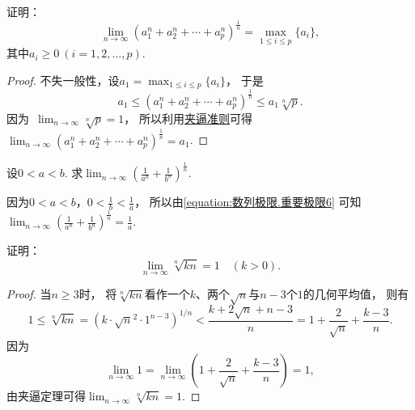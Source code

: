 \begin{example}\label{equation:数列极限.重要极限6}
证明：\begin{equation}
	\lim_{n\to\infty} (a_1^n + a_2^n + \dotsb + a_p^n)^{\frac1n}
	= \max_{1\leq i\leq p} \{a_i\},
\end{equation}
其中\(a_i\geq0\ (i=1,2,\dotsc,p)\).
\begin{proof}
不失一般性，设\(a_1 = \max_{1\leq i\leq p} \{a_i\}\)，
于是\[
	a_1 \leq (a_1^n + a_2^n + \dotsb + a_p^n)^{\frac1n} \leq a_1 \sqrt[n]{p}.
\]
因为~\hyperref[example:极限.常数的方根的极限2]{\(\lim_{n\to\infty} \sqrt[n]{p} = 1\)}，
所以利用\hyperref[theorem:数列极限.夹逼准则]{夹逼准则}可得
\(\lim_{n\to\infty} (a_1^n + a_2^n + \dotsb + a_p^n)^{\frac1n} = a_1\).
\end{proof}
\end{example}
\begin{example}
设\(0<a<b\).
求\(\lim_{n\to\infty} \left( \frac1{a^n} + \frac1{b^n} \right)^{\frac1n}\).
\begin{solution}
因为\(0<a<b\)，\(0<\frac1b<\frac1a\)，
所以由\cref{equation:数列极限.重要极限6} 可知
\(\lim_{n\to\infty} \left( \frac1{a^n} + \frac1{b^n} \right)^{\frac1n} = \frac1a\).
\end{solution}
\end{example}

\begin{example}
证明：\begin{equation}\label{equation:数列极限.重要极限3}
	\lim_{n\to\infty} \sqrt[n]{k n} = 1
	\quad(k>0).
\end{equation}
\begin{proof}
当\(n \geq 3\)时，
将\(\sqrt[n]{k n}\)看作一个\(k\)、两个\(\sqrt{n}\)与\(n-3\)个\(1\)的几何平均值，
则有\[
	1 \leq \sqrt[n]{k n} = (k \cdot \sqrt{n}^2 \cdot 1^{n-3})^{1/n}
	< \frac{k + 2\sqrt{n} + n-3}{n}
	= 1 + \frac{2}{\sqrt{n}} + \frac{k-3}{n}.
\]
因为\[
	\lim_{n\to\infty} 1
	= \lim_{n\to\infty} \left(1 + \frac{2}{\sqrt{n}} + \frac{k-3}{n}\right) = 1,
\]
由夹逼定理可得\(\lim_{n\to\infty} \sqrt[n]{k n} = 1\).
\end{proof}
\end{example}

